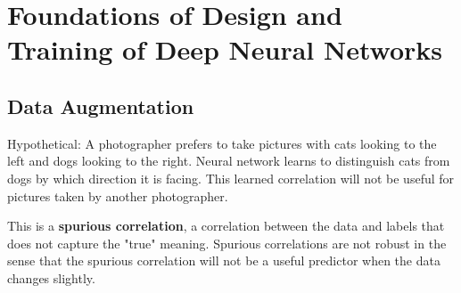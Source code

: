 \chapter{Foundations of Design and Training of Deep Neural Networks}

\section{Data Augmentation}

\begin{definition}
    Hypothetical: A photographer prefers to take pictures with cats looking to the left and dogs looking to the right. Neural network learns to distinguish cats from dogs by which direction it is facing. This learned correlation will not be useful for pictures taken by another photographer.

    This is a \textbf{spurious correlation}, a correlation between the data and labels that does not capture the "true" meaning. Spurious correlations are not robust in the sense that the spurious correlation will not be a useful predictor when the data changes slightly.
\end{definition}

